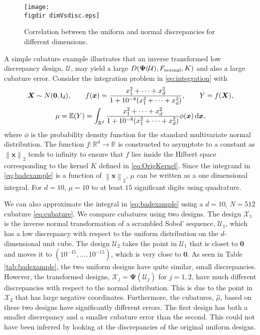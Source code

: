 \documentclass[graybox]{svmult}
\newcommand{\reals}{\mathbb{R}}
\newcommand{\vx}{\boldsymbol{x}}
\newcommand{\vX}{\boldsymbol{X}}
\newcommand{\vzero}{\boldsymbol{0}}
\newcommand{\vPsi}{\boldsymbol{\Psi}}
\newcommand{\dif}{{\rm d}}
\newcommand{\Udes}{\mathcal{U}}
\newcommand{\Xdes}{\mathcal{X}}
\newcommand{\Ex}{\mathbb{E}}
\newcommand{\norm}[2][{}]{\ensuremath{\left \lVert #2 \right \rVert}_{#1}}
\newcommand{\normal}{\textup{normal}}
\newcommand{\figdir}{code/} %
\begin{document}
\begin{figure}[ht]
\begin{center}
\texttt{[image: \\figdir dimVsdisc.eps]}
\caption{Correlation between the uniform and normal discrepancies for different dimensions. \label{fig:DiscVsd}}
\end{center}
\end{figure}


\begin{example} A simple cubature example illustrates that an inverse transformed low discrepancy design, $\Udes$, may yield a large $D(\vPsi(\Udes),F_\normal, K)$ and also a large cubature error. Consider the integration problem in \eqref{eq:integration} with
\begin{subequations} \label{eq:badexample}
\begin{gather}
\vX \sim  N(\vzero, {\mathsf I}_d), \qquad f(\vx) = \frac{x_1^2+\cdots+x^2_d}{1+10^{-8}(x_1^2+\cdots+x_d^2)}, \qquad Y = f(\vX),\\
\label{eq:badexampleb}
\mu = \Ex(Y) = \int_{\reals^d} \frac{x_1^2+\cdots+x^2_d}{1+10^{-8}(x_1^2+\cdots+x_d^2)} \phi(\vx) \, \dif \vx,
\end{gather}
\end{subequations}
where $\phi$ is the probability density function for the standard multivariate normal distribution.  The function $f:\reals^d \to \reals$ is constructed to asymptote to a constant as $\norm[2]{\vx}$ tends to infinity to ensure that $f$ lies inside the Hilbert space corresponding to the kernel $K$ defined in \eqref{eq:OrigKernel}.
Since the integrand in \eqref{eq:badexample} is a function of $\norm[2]{\vx}$, $\mu$ can be written as a one dimensional integral.  For $d=10$, $\mu = 10$ to at least $15$ significant digits using quadrature.

We can also approximate the integral in \eqref{eq:badexample} using a $d=10$, $N=512$ cubature \eqref{eq:cubature}.  We compare cubatures using two designs.  The design $\Xdes_1$ is the inverse normal transformation of a scrambled Sobol' sequence, $\Udes_1$, which has a low discrepancy with respect to the uniform distribution on the $d$-dimensional unit cube.  The design $\Udes_2$ takes the point in $\Udes_1$ that is closet to $\vzero$ and moves it to $\left(10^{-15}, \ldots, 10^{-15}\right)$, which is very close to $\vzero$.  As seen in Table \ref{tab:badexample}, the two uniform designs have quite similar, small discrepancies.  However, the transformed designs, $\Xdes_j = \vPsi(\Udes_j)$ for $j=1,2$, have much different discrepancies with respect to the normal distribution.  This is due to the point in $\Xdes_2$ that has large negative coordinates.  Furthermore, the cubatures, $\hat{\mu}$, based on these two designs have significantly different errors.  The first design has both a smaller discrepancy and a smaller cubature error than the second.  This could not have been inferred by looking at the discrepancies of the original uniform designs.



\end{example}
\end{document}
